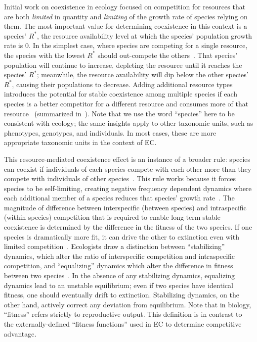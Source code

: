 Initial work on coexistence in ecology focused on competition for resources that are both \textit{limited} in quantity and \textit{limiting}
of the growth rate of species relying on them. The most important value for determining coexistence in this context is a species' $R^{*}$, the resource availability level at which the species' population growth rate is 0. In the simplest case, where species are competing for a single resource, the species with the lowest $R^*$ 
should out-compete the others~\cite{grover_resource_1997}. That species' population will continue to increase, depleting the resource until it reaches the species' $R^*$; meanwhile, the resource availability will dip below the other species' $R^*$, causing their populations to decrease. Adding additional resource types introduces the potential for stable coexistence among multiple species if each species is a better competitor for a different resource and consumes more of that resource~\cite{chase_ecological_2003} (summarized in~\cite{letten_linking_2017}). Note that we use the word ``species'' here to be consistent with ecology; the same insights apply to other taxonomic units, such as phenotypes, genotypes, and individuals. In most cases, these are more appropriate taxonomic units in the context of EC.

This resource-mediated coexistence effect is an instance of a broader rule: species can coexist if individuals of each species compete with each other more than they compete with individuals of other species~\cite{chesson_mechanisms_2000}. This rule works because it forces species to be self-limiting, creating negative frequency dependent dynamics where each additional member of a species reduces that species' growth rate~\cite{adler_niche_2007}. The magnitude of difference between interspecific (between species) and intraspecific (within species) competition that is required to enable long-term stable coexistence is determined by the difference in the fitness of the two species. If one species is dramatically more fit, it can drive the other to extinction even with limited competition~\cite{chesson_mechanisms_2000}. Ecologists draw a distinction between ``stabilizing'' dynamics, which alter the ratio of interspecific competition and intraspecific competition, and ``equalizing'' dynamics which alter the difference in fitness between two species~\cite{adler_niche_2007}. In the absence of any stabilizing dynamics, equalizing dynamics lead to an unstable equilibrium; even if two species have identical fitness, one should eventually drift to extinction. Stabilizing dynamics, on the other hand, actively correct any deviation from equilibrium. Note that in biology, ``fitness'' refers strictly to reproductive output. This definition is in contrast to the externally-defined ``fitness functions'' used in EC to determine competitive advantage.

